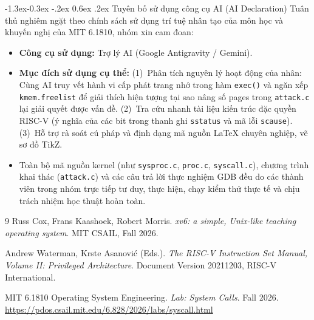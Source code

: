 \documentclass[11pt,a4paper]{article}
\makeatletter
\renewcommand\subsection{\@startsection{subsection}{2}{\z@}%
                                     {-1.3ex\@plus -0.3ex \@minus -.2ex}%
                                     {0.6ex \@plus .2ex}%
                                     {\normalfont\normalsize\bfseries}}
\makeatother
\begin{document}
\subsection{Tuyên bố sử dụng công cụ AI (AI Declaration)}
Tuân thủ nghiêm ngặt theo chính sách sử dụng trí tuệ nhân tạo của môn học và khuyến nghị của MIT 6.1810, nhóm xin cam đoan:
\begin{itemize}
    \item \textbf{Công cụ sử dụng:} Trợ lý AI (Google Antigravity / Gemini).
    \item \textbf{Mục đích sử dụng cụ thể:}
    (1)~Phân tích nguyên lý hoạt động của nhân: Cùng AI truy vết hành vi cấp phát trang nhớ trong hàm \texttt{exec()} và ngăn xếp \texttt{kmem.freelist} để giải thích hiện tượng tại sao nâng số pages trong \texttt{attack.c} lại giải quyết được vấn đề.
    (2)~Tra cứu nhanh tài liệu kiến trúc đặc quyền RISC-V (ý nghĩa của các bit trong thanh ghi \texttt{sstatus} và mã lỗi \texttt{scause}).
    (3)~Hỗ trợ rà soát cú pháp và định dạng mã nguồn LaTeX chuyên nghiệp, vẽ sơ đồ TikZ.
    \item Toàn bộ mã nguồn kernel (như \texttt{sysproc.c}, \texttt{proc.c}, \texttt{syscall.c}), chương trình khai thác (\texttt{attack.c}) và các câu trả lời thực nghiệm GDB đều do các thành viên trong nhóm trực tiếp tư duy, thực hiện, chạy kiểm thử thực tế và chịu trách nhiệm học thuật hoàn toàn.
\end{itemize}

\begingroup
\footnotesize
\begin{thebibliography}{9}
\setlength{\itemsep}{0pt}
Russ Cox, Frans Kaashoek, Robert Morris.
\textit{xv6: a simple, Unix-like teaching operating system}. MIT CSAIL, Fall 2026.

Andrew Waterman, Krste Asanovi\'{c} (Eds.).
\textit{The RISC-V Instruction Set Manual, Volume II: Privileged Architecture}.
Document Version 20211203, RISC-V International.

MIT 6.1810 Operating System Engineering.
\textit{Lab: System Calls}. Fall 2026.
\url{https://pdos.csail.mit.edu/6.828/2026/labs/syscall.html}
\end{thebibliography}
\endgroup
\end{document}
